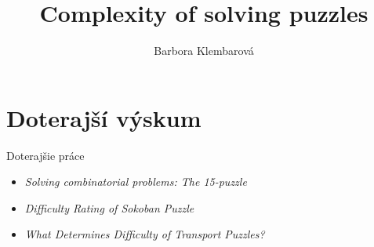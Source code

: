\documentclass[xcolor={table}]{beamer}
\title{Complexity of solving puzzles}
\author{Barbora Klembarová}
\institute{RNDr. Michal Forišek, PhD.}
\begin{document}
		
    \begin{frame}
    	\titlepage
    \end{frame}
    
    \section{Doterajší výskum}
    	    \begin{frame}{Doterajšie práce}
    				\begin{block}{}
    					\begin{itemize}
    						\item \emph{Solving combinatorial problems: The 15-puzzle} \cite{Pizlo2005}
    						\item \emph{Difficulty Rating of Sokoban Puzzle} \cite{Jarusek2010}
    						\item \emph{What Determines Difficulty of Transport Puzzles?} \cite{transport}
    					\end{itemize}
    				\end{block}
    		\end{frame} 
\end{document}
